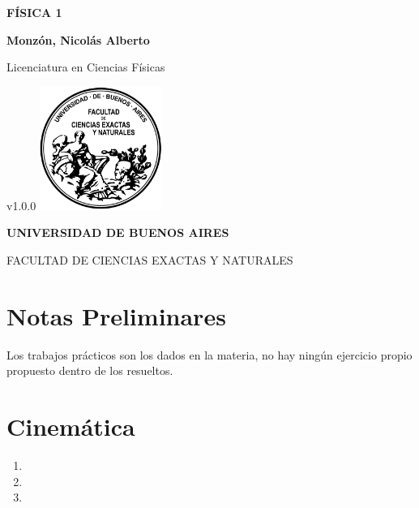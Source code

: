 \documentclass[a4paper, 12pt, oneside, titlepage, openany]{book}
\begin{document}

\begin{titlepage}

	\centering
	{\textbf{\fontsize{16}{17}\selectfont F\'ISICA 1} \par}
	\vspace{1cm}
	{\textbf{\fontsize{16}{17}\selectfont Monz\'on, Nicol\'as Alberto} \par}
	\vspace{1.5cm}
	{\fontsize{16}{17}\selectfont Licenciatura en Ciencias F\'isicas \par}
	\vspace{1cm}
	\vfill
		v1.0.0
	\vfill
	\includegraphics[width=0.30\textwidth]{../images/UBA}\par \vspace{1cm}
	{\textbf{\fontsize{14}{14}\selectfont UNIVERSIDAD DE BUENOS AIRES} \par}
	{\fontsize{14}{14}\selectfont FACULTAD DE CIENCIAS EXACTAS Y NATURALES \par}

\end{titlepage}

\chapter*{Notas Preliminares}
Los trabajos pr\'acticos son los dados en la materia, no hay ning\'un ejercicio propio propuesto dentro de los resueltos.

\tableofcontents

\chapter{Cinem\'atica}
\begin{enumerate}
	\item 
	\item 
	\item 
\end{enumerate}

%



\end{document}
